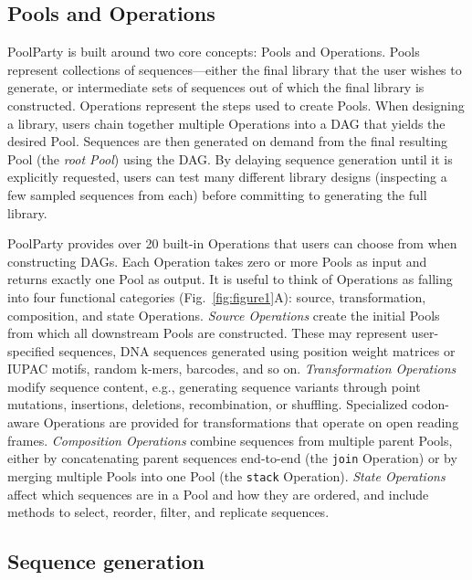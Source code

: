 \documentclass[unnumsec,webpdf,modern,large]{mam-authoring-template}%
\theoremstyle{thmstyleone}%
\theoremstyle{thmstyletwo}%
\theoremstyle{thmstylethree}%
\begin{document}
\subsection{Pools and Operations}

PoolParty is built around two core concepts: Pools and Operations. Pools represent collections of sequences---either the final library that the user wishes to generate, or intermediate sets of sequences out of which the final library is constructed. Operations represent the steps used to create Pools. When designing a library, users chain together multiple Operations into a DAG that yields the desired Pool. Sequences are then generated on demand from the final resulting Pool (the \emph{root Pool}) using the DAG. By delaying sequence generation until it is explicitly requested, users can test many different library designs (inspecting a few sampled sequences from each) before committing to generating the full library.  

PoolParty provides over 20 built-in Operations that users can choose from when constructing DAGs. Each Operation takes zero or more Pools as input and returns exactly one Pool as output. It is useful to think of Operations as falling into four functional categories (Fig.~\ref{fig:figure1}A): source, transformation, composition, and state Operations. \emph{Source Operations} create the initial Pools from which all downstream Pools are constructed. These may represent user-specified sequences, DNA sequences generated using position weight matrices or IUPAC motifs, random k-mers, barcodes, and so on. \emph{Transformation Operations} modify sequence content, e.g., generating sequence variants through point mutations, insertions, deletions, recombination, or shuffling. Specialized codon-aware Operations are provided for transformations that operate on open reading frames. \emph{Composition Operations} combine sequences from multiple parent Pools, either by concatenating parent sequences end-to-end (the \texttt{join} Operation) or by merging multiple Pools into one Pool (the \texttt{stack} Operation). \emph{State Operations} affect which sequences are in a Pool and how they are ordered, and include methods to select, reorder, filter, and replicate sequences.

\subsection{Sequence generation}
\end{document}
